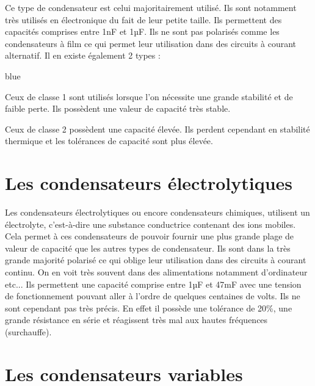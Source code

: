 Ce type de condensateur est celui majoritairement utilisé. Ils sont notamment très utilisés en électronique du fait de leur petite 
taille. Ils permettent des capacités comprises entre 1nF et 1µF. Ils ne sont pas polarisés comme les condensateurs à film ce qui 
permet leur utilisation dans des circuits à courant alternatif. Il en existe également 2 types :\\

\begin{items}{blue}{\Triangle}
    \item Ceux de classe 1 sont utilisés lorsque l’on nécessite une grande stabilité et de faible perte. Ils possèdent une valeur de capacité très stable.\\
    \item Ceux de classe 2 possèdent une capacité élevée. Ils perdent cependant en stabilité thermique et les tolérances de capacité sont plus élevée.
\end{items}


\newpage
\section{Les condensateurs électrolytiques}

Les condensateurs électrolytiques ou encore condensateurs chimiques, utilisent un électrolyte, c’est-à-dire une substance conductrice contenant des ions mobiles. Cela permet à ces condensateurs de pouvoir fournir une plus grande plage de valeur de capacité que les autres types de condensateur. Ils sont dans la très grande majorité polarisé ce qui oblige leur utilisation dans des circuits à courant continu. On en voit très souvent dans des alimentations notamment d'ordinateur etc... Ils permettent une capacité comprise entre 1µF et 47mF avec une tension de fonctionnement pouvant aller à l’ordre de quelques centaines de volts. Ils ne sont cependant pas très précis. En effet il possède une tolérance de 20\%, une grande résistance en série et réagissent très mal aux hautes fréquences (surchauffe). 





\section{Les condensateurs variables}

